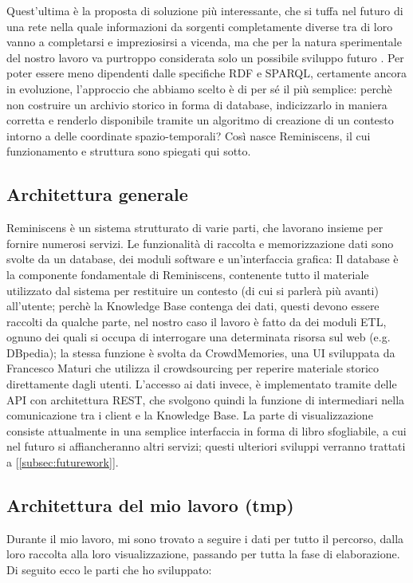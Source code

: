 \documentclass[sigproc-sp.tex]{subfiles}
\begin{document}
Quest’ultima è la proposta di soluzione più interessante, che si tuffa nel futuro di una rete nella quale informazioni da sorgenti completamente diverse tra di loro vanno a completarsi e impreziosirsi a vicenda, ma che per la natura sperimentale del nostro lavoro va purtroppo considerata solo un possibile sviluppo futuro .
Per poter essere meno dipendenti dalle specifiche RDF e SPARQL, certamente ancora in evoluzione, l’approccio che abbiamo scelto è di per sé il più semplice: perchè non costruire un archivio storico in forma di database, indicizzarlo in maniera corretta e renderlo disponibile tramite un algoritmo di creazione di un contesto intorno a delle coordinate spazio-temporali? Così nasce Reminiscens, il cui funzionamento e struttura sono spiegati qui sotto.

\subsection{Architettura generale}
Reminiscens è un sistema strutturato di varie parti, che lavorano insieme per fornire numerosi servizi. Le funzionalità di raccolta e memorizzazione dati sono svolte da un database, dei moduli software e un’interfaccia grafica: Il database è la componente fondamentale di Reminiscens, contenente tutto il materiale utilizzato dal sistema per restituire un contesto (di cui si parlerà più avanti) all’utente; perchè la Knowledge Base contenga dei dati, questi devono essere raccolti da qualche parte, nel nostro caso il lavoro è fatto da dei moduli ETL, ognuno dei quali si occupa di interrogare una determinata risorsa sul web (e.g. DBpedia); la stessa funzione è svolta da CrowdMemories, una UI sviluppata da Francesco Maturi che utilizza il crowdsourcing per reperire materiale storico direttamente dagli utenti. L’accesso ai dati invece, è implementato tramite delle API con architettura REST, che svolgono quindi la funzione di intermediari nella comunicazione tra i client e la Knowledge Base. La parte di visualizzazione consiste attualmente in una semplice interfaccia in forma di libro sfogliabile, a cui nel futuro si affiancheranno altri servizi; questi ulteriori sviluppi verranno trattati a [\ref{subsec:futurework}].

\subsection{Architettura del mio lavoro (tmp)}
Durante il mio lavoro, mi sono trovato a seguire i dati per tutto il percorso, dalla loro raccolta alla loro visualizzazione, passando per tutta la fase di elaborazione. Di seguito ecco le parti che ho sviluppato:
\end{document}
